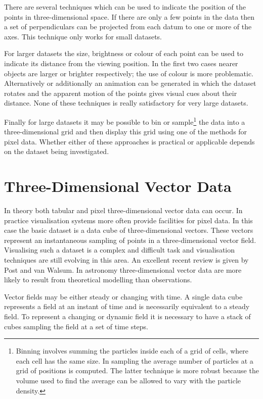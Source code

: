 \documentclass[twoside,11pt]{article}
\newcommand{\xlabel}[1]{}
\begin{document}
There are several techniques which can be used to indicate the position
of the points in three-dimensional space. If there are only a few
points in the data then a set of perpendiculars can be projected from
each datum to one or more of the axes. This technique only works for
small datasets.

For larger datasets the size, brightness or colour of each point can
be used to indicate its distance from the viewing position. In the
first two cases nearer objects are larger or brighter respectively;
the use of colour is more problematic. Alternatively or additionally
an animation can be generated in which the dataset rotates and the
apparent motion of the points gives visual cues about their distance.
None of these techniques is really satisfactory for very large datasets.

\pagebreak
Finally for large datasets it may be possible to bin or
sample\footnote{Binning involves summing the particles inside each of a
grid of cells, where each cell has the same size. In sampling the average
number of particles at a grid of positions is computed. The latter
technique is more robust because the volume used to find the average
can be allowed to vary with the particle density.} the data into a
three-dimensional grid and then display this grid using one of the
methods for pixel data. Whether either of these approaches is practical
or applicable depends on the dataset being investigated.


\section{Three-Dimensional Vector Data
\label{VECTOR3D} \xlabel{VECTOR3D} }

In theory both tabular and pixel three-dimensional vector data can
occur. In practice visualisation systems more often provide facilities
for pixel data. In this case the basic dataset is a data cube of
three-dimensional vectors. These vectors represent an instantaneous
sampling of points in a three-dimensional vector field. Visualising
such a dataset is a complex and difficult task and visualisation
techniques are still evolving in this area. An excellent recent review
is given by Post and van Walsum\cite{POST}. In astronomy
three-dimensional vector data are more likely to result from theoretical
modelling than observations.

Vector fields may be either steady or changing with time. A single data
cube represents a field at an instant of time and is necessarily
equivalent to a steady field. To represent a changing or dynamic field
it is necessary to have a stack of cubes sampling the field at a set of
time steps.
\end{document}
